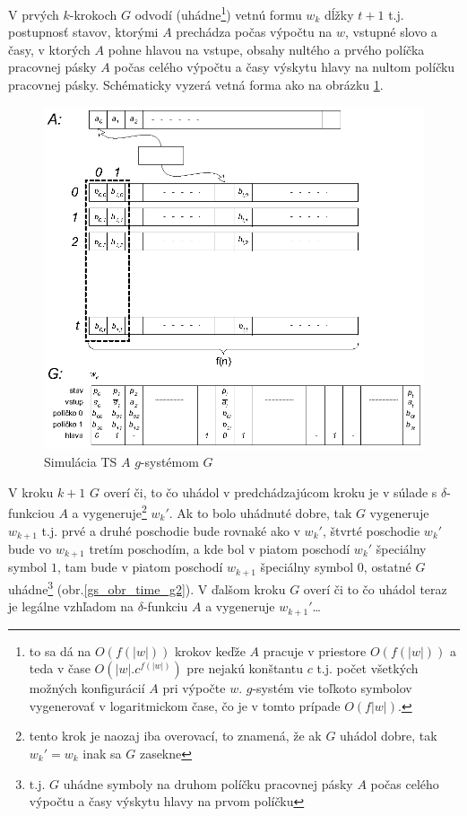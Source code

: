 \begin{dokaz}
  V prvých $k$-krokoch $G$ odvodí (uhádne\footnote{to sa dá na
  $O(f(|w|))$ krokov keďže $A$ pracuje v priestore $O(f(|w|))$ a
  teda v čase $O(|w|.c^{f(|w|)})$ pre nejakú konštantu $c$ t.j.
  počet všetkých možných konfigurácií $A$ pri výpočte $w$. $g$-systém vie toľkoto
  symbolov vygenerovať v logaritmickom čase, čo je v tomto prípade $O(f|w|)$.}) vetnú
  formu $w_k$ dĺžky $t+1$ t.j. postupnosť stavov, ktorými $A$
  prechádza počas výpočtu na $w$, vstupné slovo a časy, v ktorých
  $A$ pohne hlavou na vstupe, obsahy nultého a prvého políčka
  pracovnej pásky $A$ počas celého výpočtu a časy výskytu hlavy na
  nultom políčku pracovnej pásky. Schématicky vyzerá vetná forma ako
  na obrázku \ref{gs_obr_time_g}.

  \begin{figure}[!ht]
    \centering
    \includegraphics{img/gsystems/time_g}
    \caption{Simulácia TS $A$ $g$-systémom $G$} \label{gs_obr_time_g}
  \end{figure}

  V kroku $k+1$ $G$ overí či, to čo uhádol v predchádzajúcom kroku
  je v súlade s $\delta$-funkciou $A$ a vygeneruje\footnote{tento
  krok je naozaj iba overovací, to znamená, že ak $G$ uhádol dobre,
  tak $w_k'=w_k$ inak sa $G$ zasekne} $w_k'$. Ak to bolo uhádnuté
  dobre, tak $G$ vygeneruje $w_{k+1}$ t.j. prvé a druhé poschodie
  bude rovnaké ako v $w_k'$, štvrté poschodie $w_k'$ bude vo
  $w_{k+1}$ tretím poschodím, a kde bol v piatom poschodí $w_k'$
  špeciálny symbol $1$, tam bude v piatom poschodí $w_{k+1}$
  špeciálny symbol $0$, ostatné $G$ uhádne\footnote{t.j. $G$ uhádne
  symboly na druhom políčku pracovnej pásky $A$ počas celého výpočtu
  a časy výskytu hlavy na prvom políčku} (obr.\ref{gs_obr_time_g2}). V
  ďalšom kroku $G$ overí či to čo uhádol teraz je legálne vzhľadom
  na $\delta$-funkciu $A$ a vygeneruje $w_{k+1}'$\dots


\end{dokaz}
